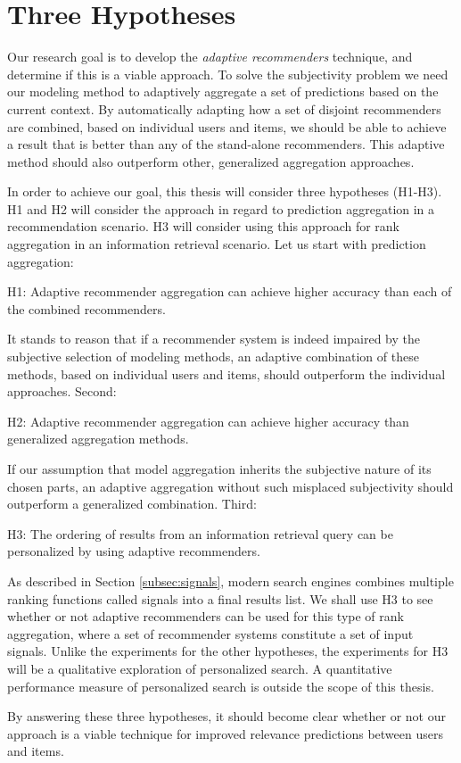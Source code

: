 \section{Three Hypotheses}
\label{sec:hypotheses}

Our research goal is to develop the \emph{adaptive recommenders} technique, and determine if this is a viable approach.
To solve the subjectivity problem we need our modeling method
to adaptively aggregate a set of predictions based on the current context.
By automatically adapting how a set of disjoint recommenders
are combined, based on individual users and items, we should be able to achieve a
result that is better than any of the stand-alone recommenders.
This adaptive method should also outperform other, generalized aggregation approaches.

In order to achieve our goal, this thesis will consider three hypotheses (H1-H3).
H1 and H2 will consider the approach in regard to prediction aggregation
in a recommendation scenario. H3 will consider using this approach for
rank aggregation in an information retrieval scenario.
Let us start with prediction aggregation:

\begin{blockquote}
  H1: Adaptive recommender aggregation can achieve higher accuracy
  than each of the combined recommenders.
\end{blockquote}
%
It stands to reason that if a recommender system is indeed impaired
by the subjective selection of modeling methods,
an adaptive combination of these methods, based on individual users and items, 
should outperform the individual approaches.
Second:

\begin{blockquote}
  H2: Adaptive recommender aggregation can achieve higher accuracy than generalized aggregation methods.
\end{blockquote}
%
If our assumption that model aggregation inherits the subjective nature of its chosen parts,
an adaptive aggregation without such misplaced subjectivity should outperform a
generalized combination.
Third:

\begin{blockquote}
  H3: The ordering of results from an information retrieval query
  can be personalized by using adaptive recommenders.
\end{blockquote}
%
As described in Section \ref{subsec:signals},
modern search engines combines multiple ranking functions called signals into a final results list.
We shall use H3 to see whether or not adaptive recommenders can be used for this type of rank aggregation,
where a set of recommender systems constitute a set of input signals.
Unlike the experiments for the other hypotheses, the experiments for H3 
will be a qualitative exploration of personalized search.
A quantitative performance measure of personalized search is outside the scope of this thesis.

By answering these three hypotheses, it should become clear whether or not
our approach is a viable technique for improved relevance predictions
between users and items.

